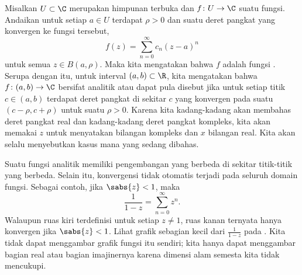 Misalkan $U \subset \C$ merupakan himpunan terbuka dan
$f \colon U \to \C$ suatu fungsi.
Andaikan untuk setiap $a \in U$ terdapat $\rho > 0$ dan suatu deret
pangkat yang konvergen ke fungsi tersebut,
\begin{equation*}
f(z) = \sum_{n=0}^\infty c_n {(z-a)}^n
\end{equation*}
untuk semua $z \in B(a,\rho)$.
Maka kita mengatakan bahwa $f$ adalah fungsi \emph{}.
Serupa dengan itu, untuk interval $(a,b) \subset \R$, kita mengatakan bahwa $f \colon (a,b) \to \C$
bersifat analitik atau dapat pula disebut \emph{}
jika untuk setiap titik $c \in
(a,b)$ terdapat deret pangkat di sekitar $c$ yang konvergen pada suatu
$(c-\rho,c+\rho)$
untuk suatu $\rho > 0$.
Karena kita kadang-kadang akan membahas deret pangkat real dan kadang-kadang
deret pangkat kompleks, kita akan memakai $z$ untuk menyatakan bilangan kompleks dan $x$ bilangan real.
Kita akan selalu menyebutkan kasus mana yang sedang dibahas.

Suatu fungsi analitik memiliki pengembangan yang berbeda di sekitar titik-titik yang berbeda.
Selain itu, konvergensi tidak otomatis terjadi pada seluruh
domain fungsi.  Sebagai contoh, jika $\sabs{z} < 1$, maka
\begin{equation*}
\frac{1}{1-z} = \sum_{n=0}^\infty z^n .
\end{equation*}
Walaupun ruas kiri terdefinisi untuk setiap $z \neq 1$, ruas kanan
ternyata hanya konvergen jika $\sabs{z} < 1$.  Lihat grafik
sebagian kecil dari $\frac{1}{1-z}$ pada .
Kita tidak dapat menggambar grafik
fungsi itu sendiri; kita hanya dapat menggambar bagian real atau bagian imajinernya karena
dimensi alam semesta kita tidak mencukupi.

\begin{myfigureht}
\caption{Grafik bagian real dan bagian imajiner dari $z=x+iy \mapsto \frac{1}{1-z}$
pada persegi $[-0.8,0.8]^2$.  Singularitas di $z=1$ ditandai dengan
garis vertikal putus-putus.\label{fig:1over1mz}}
\end{myfigureht}

